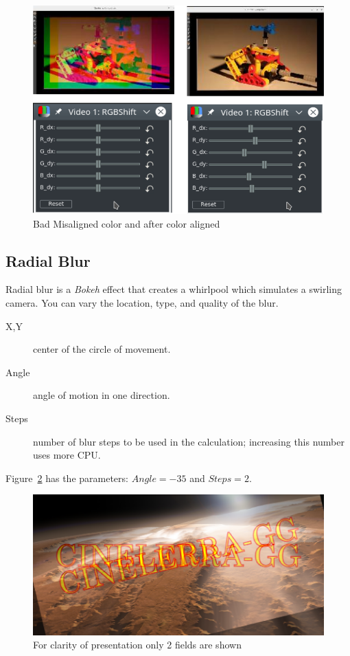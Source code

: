 \begin{figure}[hbtp]
    \centering
    \includegraphics[width=0.8\linewidth]{images/rgbshift.png}
    \caption{Bad Misaligned color and after color aligned}
    \label{fig:rgbshift}
\end{figure}

\subsection{Radial Blur}%
\label{sub:radial_blur}

Radial blur is a \textit{Bokeh} effect that creates a whirlpool which simulates a swirling camera. You can vary the location, type, and quality of the blur.

\begin{description}
    \item[X,Y] center of the circle of movement.
    \item[Angle] angle of motion in one direction.
    \item[Steps] number of blur steps to be used in the calculation; increasing this number uses more CPU.
\end{description}

Figure~\ref{fig:radial} has the parameters: $Angle=-35$ and $Steps=2$.

\begin{figure}[hbtp]
    \centering
    \includegraphics[width=0.8\linewidth]{images/radial.png}
    \caption{For clarity of presentation only 2 fields are shown}
    \label{fig:radial}
\end{figure}

